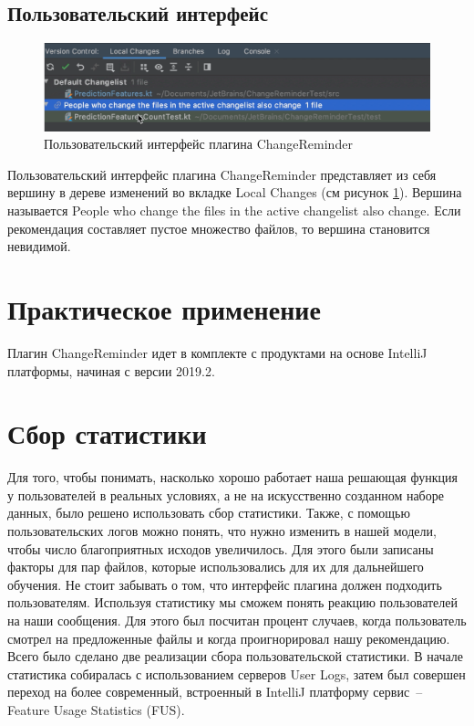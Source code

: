 \subsection{Пользовательский интерфейс}
\begin{figure}[!h]
\caption{Пользовательский интерфейс плагина ChangeReminder}\label{ChangeReminder-ui}
\centering
\includegraphics[scale=0.4]{ChangeReminderUI.png}
\end{figure}
Пользовательский интерфейс плагина ChangeReminder представляет из себя вершину в дереве изменений во вкладке Local Changes (см рисунок \ref{ChangeReminder-ui}). Вершина называется People who change the files in the active changelist also change. Если рекомендация составляет пустое множество файлов, то вершина становится невидимой.
\section{Практическое применение}
Плагин ChangeReminder идет в комплекте с продуктами на основе IntelliJ платформы, начиная с версии 2019.2.

\section{Сбор статистики}\label{stats-main}
Для того, чтобы понимать, насколько хорошо работает наша решающая функция у пользователей в реальных условиях, а не на искусственно созданном наборе данных, было решено использовать сбор статистики. Также, с помощью пользовательских логов можно понять, что нужно изменить в нашей модели, чтобы число благоприятных исходов увеличилось. Для этого были записаны факторы для пар файлов, которые использовались для их для дальнейшего обучения. Не стоит забывать о том, что интерфейс плагина должен подходить пользователям. Используя статистику мы сможем понять реакцию пользователей на наши сообщения. Для этого был посчитан процент случаев, когда пользователь смотрел на предложенные файлы и когда проигнорировал нашу рекомендацию. Всего было сделано две реализации сбора пользовательской статистики. В начале статистика собиралась с использованием серверов User Logs, затем был совершен переход на более современный, встроенный в IntelliJ платформу сервис~-- Feature Usage Statistics (FUS).
